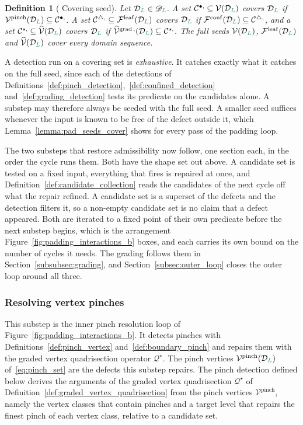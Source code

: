 \documentclass[a4paper, 12pt]{article}
\makeatletter
\newcommand{\robert}[1]{{\color{orange} #1}}
\newcommand{\quadriV}{\mathcal{Q}^{\star}}                       %
\DeclareRobustCommand{\gradeClasses}[1][]{\widehat{\V}^{\mathrm{grad} \, \ifx\@empty#1\@empty\else,#1\fi}}
\DeclareRobustCommand{\candV}[1][]{\mathcal{C}^{\bullet\ifx\@empty#1\@empty\else,#1\fi}}
\DeclareRobustCommand{\candF}[1][]{\mathcal{C}^{\triangle\ifx\@empty#1\@empty\else,#1\fi}}
\DeclareRobustCommand{\candC}[1][]{\mathcal{C}^{s\ifx\@empty#1\@empty\else,#1\fi}}
\newcommand{\quadriVup}[1]{\quadriV_{\rightarrow #1}}            %
\newcommand{\green}{\color{ForestGreen}}
\newcommand{\V}{\mathcal{V}}
\newcommand{\F}{\mathcal{F}}
\newcommand{\vertexClasses}{\widehat{\V}}
\renewcommand{\L}{{\green L}}
\newtheorem{definition}[theorem]{Definition}
\theoremstyle{definition}
\theoremstyle{plain}
\numberwithin{equation}{section}
\newcommand{\tobecut}[1]{{\color{red} #1}}     %
\DeclareRobustCommand{\domseq}[1][]{\mathcal{D}\ifx\@empty#1\@empty\else_{#1}\fi}
\newcommand{\alldomseqs}{\mathscr{D}}
\newcommand{\leafMesh}{\F^{\mathrm{leaf}}}                  %
\makeatother
\begin{document}
\begin{definition}[\robert{Covering seed}]
    \label{def:covering_seed}
    \robert{Let $\domseq[\L] \in \alldomseqs_\L$. A set $\candV \subseteq \V(\domseq[\L])$ \emph{covers} $\domseq[\L]$ if $\V^{\mathrm{pinch}}(\domseq[\L]) \subseteq \candV$. A set $\candF \subseteq \leafMesh(\domseq[\L])$ covers $\domseq[\L]$ if $\F^{\mathrm{conf}}(\domseq[\L]) \subseteq \candF$, and a set $\candC \subseteq \vertexClasses(\domseq[\L])$ covers $\domseq[\L]$ if $\gradeClasses(\domseq[\L]) \subseteq \candC$. The \emph{full seeds} $\V(\domseq[\L])$, $\leafMesh(\domseq[\L])$ and $\vertexClasses(\domseq[\L])$ cover every domain sequence.}
\end{definition}

\robert{A detection run on a covering set is \emph{exhaustive}. It catches exactly what it catches on the full seed, since each of the detections of Definitions~\ref{def:pinch_detection},~\ref{def:confined_detection} and~\ref{def:grading_detection} tests its predicate on the candidates alone. A substep may therefore always be seeded with the full seed. A smaller seed suffices whenever the input is known to be free of the defect outside it, which Lemma~\ref{lemma:pad_seeds_cover} shows for every pass of the padding loop.}

The two substeps that restore admissibility now follow, one section each, in the order the cycle runs them. Both have the shape set out above. A candidate set is tested on a fixed input, everything that fires is repaired at once, and Definition~\ref{def:candidate_collection} reads the candidates of the next cycle off what the repair refined. A candidate set is a superset of the defects and the detection filters it, so a non-empty candidate set is no claim that a defect appeared. Both are iterated to a fixed point of their own predicate before the next substep begins, which is the arrangement Figure~\ref{fig:padding_interactions_b} boxes, and each carries its own bound on the number of cycles it needs. The grading follows them in Section~\ref{subsubsec:grading}, and Section~\ref{subsec:outer_loop} closes the outer loop around all three.

\subsubsection{Resolving vertex pinches}
\label{subsubsec:pinch_resolution}

This substep is the inner pinch resolution loop of Figure~\ref{fig:padding_interactions_b}. It detects pinches with Definitions~\ref{def:pinch_vertex} and~\ref{def:boundary_pinch} and repairs them with the graded vertex quadrisection operator $\quadriV$. The pinch vertices $\V^{\mathrm{pinch}}(\domseq[\L])$ of~\eqref{eq:pinch_set} are the defects this substep repairs. The pinch detection defined below derives the arguments of the graded vertex quadrisection $\quadriV$ of Definition~\ref{def:graded_vertex_quadrisection} from the pinch vertices $\V^{\mathrm{pinch}}$, namely the vertex classes that contain pinches and a target level that repairs the finest pinch of each vertex class, relative to a candidate set.
\end{document}
